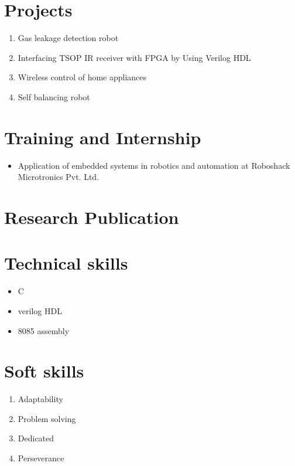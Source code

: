 \documentclass[11pt]{article}
\begin{document}
\section*{Projects}  
\begin{enumerate}
	\item Gas leakage detection robot
	\item Interfacing TSOP IR receiver with FPGA by Using Verilog HDL
	\item Wireless control of home appliances
	\item Self balancing robot
\end{enumerate}	
\section*{Training and Internship}  
\begin{itemize}
	\item	Application of embedded systems in robotics and automation at Roboshack Microtronics Pvt. Ltd. 
\end{itemize}
\section*{Research Publication}
\section*{Technical skills}   
\begin{itemize}
	\item C
	\item verilog HDL
	\item 8085 assembly
\end{itemize} 	
\section*{Soft skills}  
\begin{enumerate}
	\item Adaptability
	\item Problem solving
	\item Dedicated
	\item Perseverance
\end{enumerate}
\end{document}
